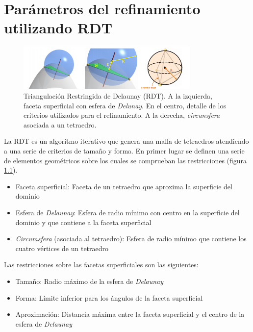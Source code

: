 \chapter{Parámetros del refinamiento utilizando RDT}
\label{anexo:criterios}


\begin{figure}[ht]
   \centering
    \includegraphics[width=0.8\textwidth]{IMG/rdt.png}
     \caption{Triangulación Restringida de Delaunay (\acs{RDT}). A la izquierda, faceta superficial con esfera de \emph{Delunay}. En el centro, detalle de los criterios utilizados para el refinamiento. A la derecha, \emph{circunsfera} asociada a un tetraedro.}
\label{fig:rdt}
\end{figure}


La \ac{RDT} es un algoritmo iterativo que genera una malla de tetraedros atendiendo a una serie de criterios de tamaño y forma. En primer lugar se definen una serie de elementos geométricos sobre los cuales se comprueban las restricciones (figura \ref{fig:rdt}).

\begin{itemize}
    \item Faceta superficial: Faceta de un tetraedro que aproxima la superficie del dominio
    \item Esfera de \emph{Delaunay}: Esfera de radio mínimo con centro en la superficie del dominio y que contiene a la faceta superficial
    \item \emph{Circumsfera} (asociada al tetraedro): Esfera de radio mínimo que contiene los cuatro vértices de un tetraedro
\end{itemize}




Las restricciones sobre las facetas superficiales son las siguientes:
\begin{itemize}
    \item  Tamaño: Radio máximo de la esfera de \emph{Delaunay}
    \item Forma: Límite inferior para los ángulos de la faceta superficial
    \item Aproximación: Distancia máxima entre la faceta superficial y el centro de la esfera de \emph{Delaunay}

\end{itemize}

